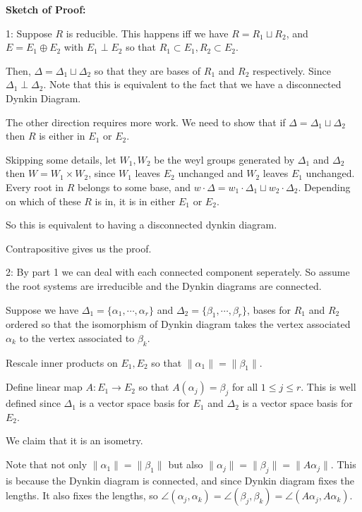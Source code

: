 \documentclass{article}
\theoremstyle{definition}
\begin{document}
\textbf{Sketch of Proof:}

1: Suppose \(R\) is reducible. This happens iff we have \(R=R_1 \sqcup R_2\), and \(E = E_1 \oplus E_2\) with \(E_1\perp E_2\) so that \(R_1 \subset E_1,R_2 \subset E_2\).

Then, \(\Delta = \Delta_1\sqcup \Delta _2\) so that they are bases of \(R_1\) and \(R_2\) respectively. Since \(\Delta_1\perp \Delta_2\). Note that this is equivalent to the fact that we have a disconnected Dynkin Diagram.

The other direction requires more work. We need to show that if \(\Delta =\Delta_1 \sqcup \Delta_2\) then \(R\) is either in \(E_1\) or \(E_2\).

Skipping some details, let \(W_1,W_2\) be the weyl groups generated by \(\Delta_1\) and \(\Delta_2\) then \(W = W_1 \times W_2\), since \(W_1\) leaves \(E_2\) unchanged and \(W_2\) leaves \(E_1\) unchanged. Every root in \(R\) belongs to some base, and \(w\cdot \Delta = w_1\cdot \Delta_1 \sqcup w_2\cdot \Delta_2\). Depending on which of these \(R\) is in, it is in either \(E_1\) or \(E_2\).

So this is equivalent to having a disconnected dynkin diagram.

Contrapositive gives us the proof.

2: By part 1 we can deal with each connected component seperately. So assume the root systems are irreducible and the Dynkin diagrams are connected.

Suppose we have \(\Delta_1 = \{ \alpha_1,\cdots,\alpha_r \} \) and \(\Delta_2 = \{ \beta_1,\cdots,\beta_r \} \), bases for \(R_1\) and \(R_2\) ordered so that the isomorphism of Dynkin diagram takes the vertex associated \(\alpha_k\) to the vertex associated to \(\beta_k\).

Rescale inner products on \(E_1,E_2\) so that \(\lVert \alpha _1 \rVert = \lVert \beta_1 \rVert \).

Define linear map \(A:E_1 \to E_2\) so that \(A(\alpha_j)=\beta_j\) for all \(1 \leq j \leq r\). This is well defined since \(\Delta_1\) is a vector space basis for \(E_1\) and \(\Delta_2\) is a vector space basis for \(E_2\).

We claim that it is an isometry.

Note that not only \(\lVert \alpha_1 \rVert = \lVert \beta _1 \rVert \) but also \(\lVert \alpha_j \rVert = \lVert \beta_j \rVert = \lVert A \alpha_j \rVert \). This is because the Dynkin diagram is connected, and since Dynkin diagram fixes the lengths. It also fixes the lengths, so \(\angle (\alpha_j,\alpha_k)=\angle (\beta_j,\beta_k)=\angle(A \alpha_j, A \alpha_k)\).
\end{document}
